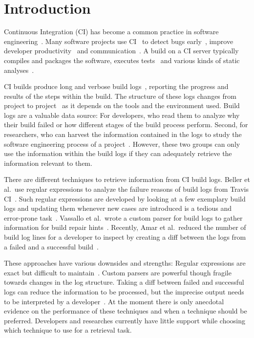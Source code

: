\documentclass[\myrootdir/main.tex]{subfiles}
\begin{document}
\chapter{Introduction}
Continuous Integration (CI) has become a common practice in software engineering~\cite{hilton2016usage}.
Many software projects use CI~\cite{hilton2016usage,staahl2014modeling,beller2017oops} to detect bugs early~\cite{vasilescu2015quality,duvall2007continuous}, improve developer productivity~\cite{miller2008hundred,hilton2016usage} and communication~\cite{downs2012ambient}.
A build on a CI server typically compiles and packages the software, executes tests~\cite{beller2017oops} and various kinds of static analyses~\cite{zampetti2017open}.

CI builds produce long and verbose build logs~\cite{beller2017oops}, reporting the progress and results of the steps within the build.
The structure of these logs changes from project to project~\cite{staahl2014modeling} as it depends on the tools and the environment used.
Build logs are a valuable data source: For developers, who read them to analyze why their build failed or how different stages of the build process perform.
Second, for researchers, who can harvest the information contained in the logs to study the software engineering process of a project~\cite{rausch2017empirical,beller2017oops,seo2014programmers,vassallo2017a-tale}.
However, these two groups can only use the information within the build logs if they can adequately retrieve the information relevant to them.

There are different techniques to retrieve information from CI build logs. Beller et al.\ use regular expressions to analyze the failure reasons of build logs from Travis CI~\cite{beller2017oops}.
Such regular expressions are developed by looking at a few exemplary build logs and updating them whenever new cases are introduced is a tedious and error-prone task~\cite{michael2019regexes}.
Vassallo et al.\ wrote a custom parser for build logs to gather information for build repair hints~\cite{vassallo2018un-break}.
Recently, Amar et al.\ reduced the number of build log lines for a developer to inspect by creating a diff between the logs from a failed and a successful build~\cite{amar2019mining}.

These approaches have various downsides and strengths:
Regular expressions are exact but difficult to maintain~\cite{michael2019regexes}.
Custom parsers are powerful though fragile towards changes in the log structure.
Taking a diff between failed and successful logs can reduce the information to be processed, but the imprecise output needs to be interpreted by a developer~\cite{amar2019mining}.
At the moment there is only anecdotal evidence on the performance of these techniques and when a technique should be preferred.
Developers and researches currently have little support while choosing which technique to use for a retrieval task.
\end{document}
